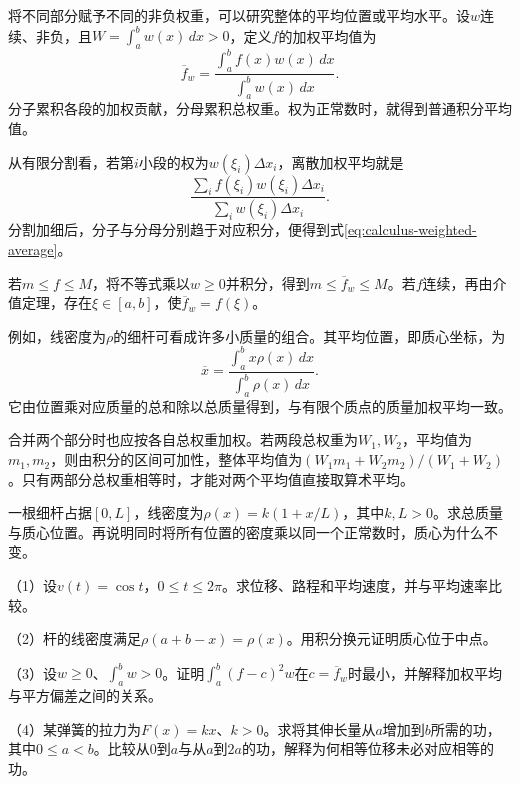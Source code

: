 将不同部分赋予不同的非负权重，可以研究整体的平均位置或平均水平。设\(w\)连续、非负，且\(W=\int_a^bw(x)\,dx>0\)，定义\(f\)的{\heiti{}加权平均值}为
\begin{equation}\label{eq:calculus-weighted-average}
 \overline f_w=\frac{\int_a^bf(x)w(x)\,dx}{\int_a^bw(x)\,dx}.
\end{equation}
分子累积各段的加权贡献，分母累积总权重。权为正常数时，就得到普通积分平均值。

从有限分割看，若第\(i\)小段的权为\(w(\xi_i)\Delta x_i\)，离散加权平均就是
\begin{equation*}
 \frac{\sum_i f(\xi_i)w(\xi_i)\Delta x_i}{\sum_iw(\xi_i)\Delta x_i}.
\end{equation*}
分割加细后，分子与分母分别趋于对应积分，便得到式\eqref{eq:calculus-weighted-average}。

若\(m\le f\le M\)，将不等式乘以\(w\ge0\)并积分，得到\(m\le\overline f_w\le M\)。若\(f\)连续，再由介值定理，存在\(\xi\in[a,b]\)，使\(\overline f_w=f(\xi)\)。

例如，线密度为\(\rho\)的细杆可看成许多小质量的组合。其平均位置，即质心坐标，为
\begin{equation*}
 \overline x=\frac{\int_a^bx\rho(x)\,dx}{\int_a^b\rho(x)\,dx}.
\end{equation*}
它由位置乘对应质量的总和除以总质量得到，与有限个质点的质量加权平均一致。

合并两个部分时也应按各自总权重加权。若两段总权重为\(W_1,W_2\)，平均值为\(m_1,m_2\)，则由积分的区间可加性，整体平均值为\((W_1m_1+W_2m_2)/(W_1+W_2)\)。只有两部分总权重相等时，才能对两个平均值直接取算术平均。

\begin{example}
一根细杆占据\([0,L]\)，线密度为\(\rho(x)=k(1+x/L)\)，其中\(k,L>0\)。求总质量与质心位置。再说明同时将所有位置的密度乘以同一个正常数时，质心为什么不变。
\end{example}

\begin{exercise}
\mbox{}\par\nobreak

（1）设\(v(t)=\cos t\)，\(0\le t\le2\pi\)。求位移、路程和平均速度，并与平均速率比较。

（2）杆的线密度满足\(\rho(a+b-x)=\rho(x)\)。用积分换元证明质心位于中点。

（3）设\(w\ge0\)、\(\int_a^bw>0\)。证明\(\int_a^b(f-c)^2w\)在\(c=\overline f_w\)时最小，并解释加权平均与平方偏差之间的关系。

（4）某弹簧的拉力为\(F(x)=kx\)、\(k>0\)。求将其伸长量从\(a\)增加到\(b\)所需的功，其中\(0\le a<b\)。比较从\(0\)到\(a\)与从\(a\)到\(2a\)的功，解释为何相等位移未必对应相等的功。

\end{exercise}

